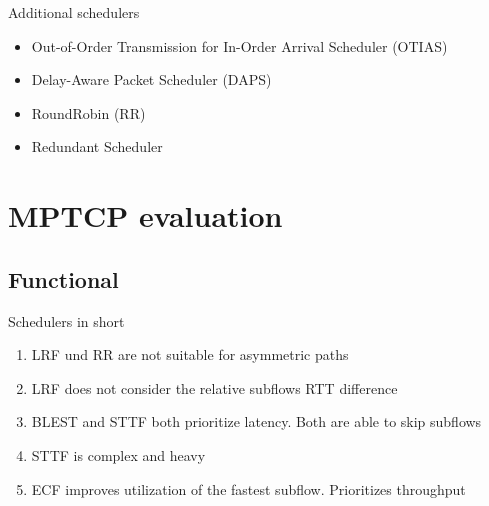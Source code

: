 \documentclass{beamer}
\begin{document}
\begin{frame}{Additional schedulers}
  \begin{itemize}
    \large
    \setlength\itemsep{1.2em}
    \item Out-of-Order Transmission for In-Order Arrival Scheduler (OTIAS)
    \item Delay-Aware Packet Scheduler (DAPS)
    \item RoundRobin (RR)
    \item Redundant Scheduler
  \end{itemize}
\end{frame}

\section{MPTCP evaluation}
\subsection{Functional}
\begin{frame}{Schedulers in short}
  \begin{center}
    \begin{enumerate}
      \setlength\itemsep{1.2em}
      \item LRF und RR are not suitable for asymmetric paths\\
      \item LRF does not consider the relative subflows RTT difference\\
      \item BLEST and STTF both prioritize latency. Both are able to skip subflows\\
      \item STTF is complex and heavy\\
      \item ECF improves utilization of the fastest subflow. Prioritizes throughput\\
    \end{enumerate}
  \end{center}
\end{frame}
\end{document}
